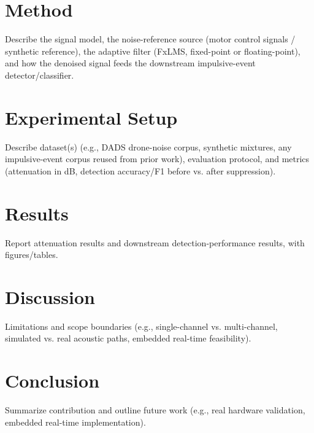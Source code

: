 \documentclass[conference]{IEEEtran}
\begin{document}
\section{Method}
\label{sec:method}
Describe the signal model, the noise-reference source (motor control signals / synthetic reference), the adaptive filter (FxLMS, fixed-point or floating-point), and how the denoised signal feeds the downstream impulsive-event detector/classifier.

\section{Experimental Setup}
\label{sec:setup}
Describe dataset(s) (e.g., DADS drone-noise corpus, synthetic mixtures, any impulsive-event corpus reused from prior work), evaluation protocol, and metrics (attenuation in dB, detection accuracy/F1 before vs. after suppression).

\section{Results}
\label{sec:results}
Report attenuation results and downstream detection-performance results, with figures/tables.

\section{Discussion}
\label{sec:discussion}
Limitations and scope boundaries (e.g., single-channel vs. multi-channel, simulated vs. real acoustic paths, embedded real-time feasibility).

\section{Conclusion}
\label{sec:conclusion}
Summarize contribution and outline future work (e.g., real hardware validation, embedded real-time implementation).



\end{document}
